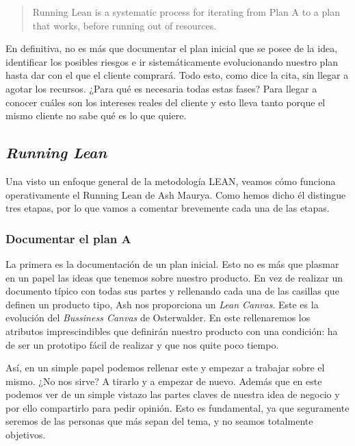\begin{quote}
	\small Running Lean is a systematic process for iterating from Plan A to a plan that works, before running out of resources.
	\begin{flushright}
	\end{flushright}
\end{quote}

En definitiva, no es más que documentar el plan inicial que se posee de la idea, identificar los posibles riesgos e ir sistemáticamente evolucionando nuestro plan hasta dar con el que el cliente comprará. Todo esto, como dice la cita, sin llegar a agotar los recursos. ¿Para qué es necesaria todas estas fases? Para llegar a conocer cuáles son los intereses reales del cliente y esto lleva tanto porque el mismo cliente no sabe qué es lo que quiere.

\subsection{\textit{Running Lean}}

Una visto un enfoque general de la metodología LEAN, veamos cómo funciona operativamente el Running Lean de Ash Maurya. Como hemos dicho él distingue tres etapas, por lo que vamos a comentar brevemente cada una de las etapas.

\subsubsection{Documentar el plan A}

La primera es la documentación de un plan inicial. Esto no es más que plasmar en un papel las ideas que tenemos sobre nuestro producto. En vez de realizar un documento típico con todas sus partes y rellenando cada una de las casillas que definen un producto tipo, Ash nos proporciona un \textit{Lean Canvas}. Este es la evolución del \textit{Bussiness Canvas} de Osterwalder. En este rellenaremos los atributos imprescindibles que definirán nuestro producto con una condición: ha de ser un prototipo fácil de realizar y que nos quite poco tiempo.

Así, en un simple papel podemos rellenar este y empezar a trabajar sobre el mismo. ¿No nos sirve? A tirarlo y a empezar de nuevo. Además que en este podemos ver de un simple vistazo las partes claves de nuestra idea de negocio y por ello compartirlo para pedir opinión. Esto es fundamental, ya que seguramente seremos de las personas que más sepan del tema, y no seamos totalmente objetivos.

